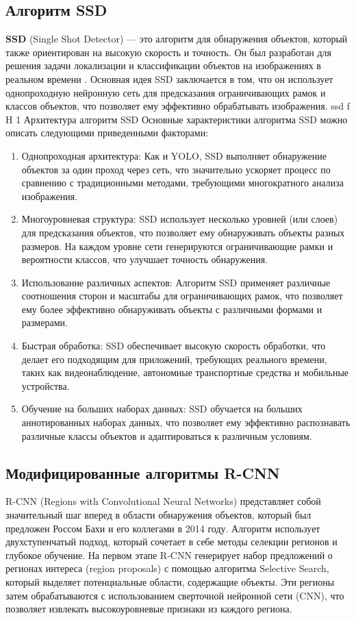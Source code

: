 \subsection{Алгоритм SSD}
\textbf{SSD} (Single Shot Detector) — это алгоритм для обнаружения объектов, который также ориентирован на высокую скорость и точность. Он был разработан для решения задачи локализации и классификации объектов на изображениях в реальном времени \cite{intro2}. Основная идея SSD заключается в том, что он использует однопроходную нейронную сеть для предсказания ограничивающих рамок и классов объектов, что позволяет ему эффективно обрабатывать изображения.
	{ssd}
	{f}
	{H}
	{1\textwidth}
	{Архитектура алгоритм SSD \cite{intro2}}
Основные характеристики алгоритма SSD можно описать следующими приведенными факторами:
\begin{enumerate}[leftmargin=1.6\parindent]
    \item Однопроходная архитектура: Как и YOLO, SSD выполняет обнаружение объектов за один проход через сеть, что значительно ускоряет процесс по сравнению с традиционными методами, требующими многократного анализа изображения.
    \item Многоуровневая структура: SSD использует несколько уровней (или слоев) для предсказания объектов, что позволяет ему обнаруживать объекты разных размеров. На каждом уровне сети генерируются ограничивающие рамки и вероятности классов, что улучшает точность обнаружения.
    \item Использование различных аспектов: Алгоритм SSD применяет различные соотношения сторон и масштабы для ограничивающих рамок, что позволяет ему более эффективно обнаруживать объекты с различными формами и размерами.
    \item Быстрая обработка: SSD обеспечивает высокую скорость обработки, что делает его подходящим для приложений, требующих реального времени, таких как видеонаблюдение, автономные транспортные средства и мобильные устройства.
    \item Обучение на больших наборах данных: SSD обучается на больших аннотированных наборах данных, что позволяет ему эффективно распознавать различные классы объектов и адаптироваться к различным условиям.
\end{enumerate}
\subsection{Модифицированные алгоритмы R-CNN}
R-CNN (Regions with Convolutional Neural Networks) представляет собой значительный шаг вперед в области обнаружения объектов, который был предложен Россом Бахи и его коллегами в 2014 году. Алгоритм использует двухступенчатый подход, который сочетает в себе методы селекции регионов и глубокое обучение. На первом этапе R-CNN генерирует набор предложений о регионах интереса (region proposals) с помощью алгоритма Selective Search, который выделяет потенциальные области, содержащие объекты. Эти регионы затем обрабатываются с использованием сверточной нейронной сети (CNN), что позволяет извлекать высокоуровневые признаки из каждого региона.

